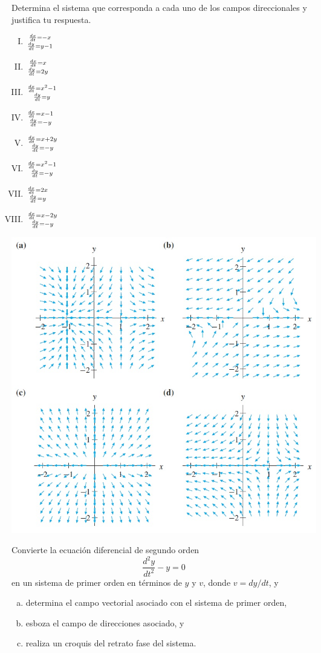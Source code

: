 \documentclass[12pt]{exam}
\begin{document}
\begin{questions}
     \question%
     Determina el sistema que corresponda a cada uno de los campos direccionales y justifica tu respuesta.
     \begin{enumerate}[I)]
         \item $\frac{dx}{dt}=-x\atop \frac{dy}{dt}=y-1$\vskip7pt
         \item $\frac{dx}{dt}=x\atop \frac{dy}{dt}=2y$\vskip7pt
         \item $\frac{dx}{dt}=x^2-1\atop \frac{dy}{dt}=y$\vskip7pt
         \item $\frac{dx}{dt}=x-1\atop \frac{dy}{dt}=-y$\vskip7pt
         \item $\frac{dx}{dt}=x+2y\atop \frac{dy}{dt}=-y$\vskip7pt
         \item $\frac{dx}{dt}=x^2-1\atop \frac{dy}{dt}=-y$\vskip7pt
         \item $\frac{dx}{dt}=2x\atop \frac{dy}{dt}=y$
         \item $\frac{dx}{dt}=x-2y\atop \frac{dy}{dt}=-y$
     \end{enumerate}
     \includegraphics[scale=.7]{F1T6.jpg}

     
     \question%
     Convierte la ecuación diferencial de segundo orden $$\frac{d^2y}{dt^2}-y=0$$ en un sistema de primer orden en términos de $y$ y $v$, donde $v=dy/dt$, y
     \begin{enumerate}[a)]
         \item determina el campo vectorial asociado con el sistema de primer orden,
         \item esboza el campo de direcciones asociado, y 
         \item realiza un croquis del retrato fase del sistema.
     \end{enumerate}



\end{questions}
\end{document}
